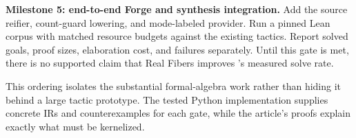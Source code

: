 \textbf{Milestone 5: end-to-end Forge and synthesis integration.} Add the source reifier, count-guard lowering, and mode-labeled provider. Run a pinned Lean corpus with matched resource budgets against the existing tactics. Report solved goals, proof sizes, elaboration cost, and failures separately. Until this gate is met, there is no supported claim that Real Fibers improves 's measured solve rate.

This ordering isolates the substantial formal-algebra work rather than hiding it behind a large tactic prototype. The tested Python implementation supplies concrete IRs and counterexamples for each gate, while the article's proofs explain exactly what must be kernelized.
